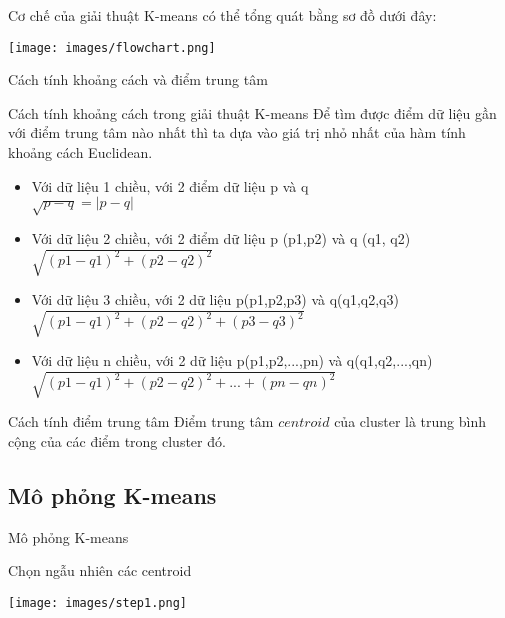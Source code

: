 \documentclass[english,10pt,table]{beamer}
\begin{document}

\begin{frame}
	\begin{block}{Cơ chế của giải thuật K-means có thể tổng quát bằng sơ đồ dưới đây:}
		\begin{center}
			\texttt{[image: images/flowchart.png]}
		\end{center}
	\end{block}
\end{frame}


\begin{frame} {Cách tính khoảng cách và điểm trung tâm}
	\begin{block} {Cách tính khoảng cách trong giải thuật K-means}
		Để tìm được điểm dữ liệu gần với điểm trung tâm nào nhất thì ta dựa vào giá trị nhỏ nhất của hàm tính khoảng cách Euclidean.
		\begin{itemize}
			\item Với dữ liệu 1 chiều, với 2 điểm dữ liệu p và q \\ $\sqrt{p-q}=|p-q|$
			\item Với dữ liệu 2 chiều, với 2 điểm dữ liệu p (p1,p2) và q (q1, q2) \\ $\sqrt{(p1-q1)^2 + (p2-q2)^2}$
			\item Với dữ liệu 3 chiều, với 2 dữ liệu p(p1,p2,p3) và q(q1,q2,q3)\\ $\sqrt{(p1-q1)^2 + (p2-q2)^2 + (p3-q3)^2}$
			\item Với dữ liệu n chiều, với 2 dữ liệu p(p1,p2,...,pn) và q(q1,q2,...,qn) \\ $\sqrt{(p1-q1)^2 + (p2-q2)^2 + ... + (pn-qn)^2}$
		\end{itemize}
	\end{block}
	\begin{block} {Cách tính điểm trung tâm}
		Điểm trung tâm \alert{$centroid$} của cluster là trung bình cộng của các điểm trong cluster đó.
	\end{block}
\end{frame}

\subsection{Mô phỏng K-means}
\begin{frame} {Mô phỏng K-means}
\begin{block}{Chọn ngẫu nhiên các centroid}
	\begin{center}
		\texttt{[image: images/step1.png]}
	\end{center}
\end{block}
\end{frame}
\end{document}

